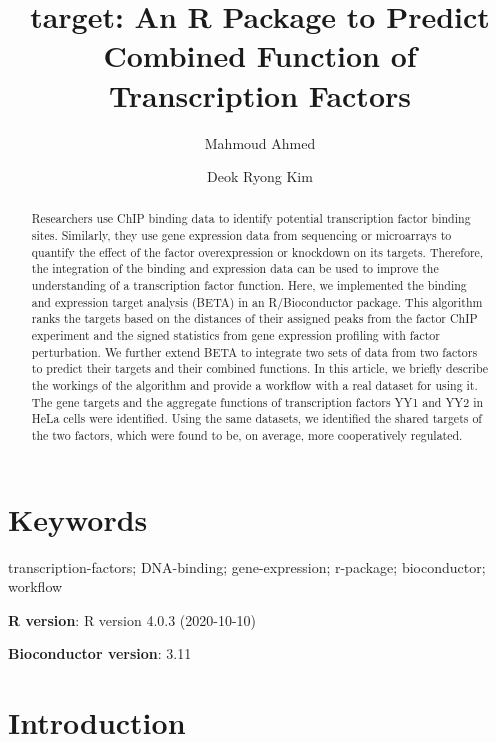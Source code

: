 \documentclass[9pt,a4paper,]{extarticle}
\begin{document}
\pagestyle{front}

\title{target: An R Package to Predict Combined Function of Transcription Factors}

\author[1]{Mahmoud Ahmed}
\author[1]{Deok Ryong Kim}

\maketitle
\thispagestyle{front}

\begin{abstract}
Researchers use ChIP binding data to identify potential transcription factor binding sites. Similarly, they use gene expression data from sequencing or microarrays to quantify the effect of the factor overexpression or knockdown on its targets. Therefore, the integration of the binding and expression data can be used to improve the understanding of a transcription factor function. Here, we implemented the binding and expression target analysis (BETA) in an R/Bioconductor package. This algorithm ranks the targets based on the distances of their assigned peaks from the factor ChIP experiment and the signed statistics from gene expression profiling with factor perturbation. We further extend BETA to integrate two sets of data from two factors to predict their targets and their combined functions. In this article, we briefly describe the workings of the algorithm and provide a workflow with a real dataset for using it. The gene targets and the aggregate functions of transcription factors YY1 and YY2 in HeLa cells were identified. Using the same datasets, we identified the shared targets of the two factors, which were found to be, on average, more cooperatively regulated.
\end{abstract}

\section*{Keywords}
transcription-factors; DNA-binding; gene-expression; r-package; bioconductor; workflow


\clearpage
\pagestyle{main}

\textbf{R version}: R version 4.0.3 (2020-10-10)

\textbf{Bioconductor version}: 3.11

\hypertarget{introduction}{%
\section{Introduction}\label{introduction}}
\end{document}
